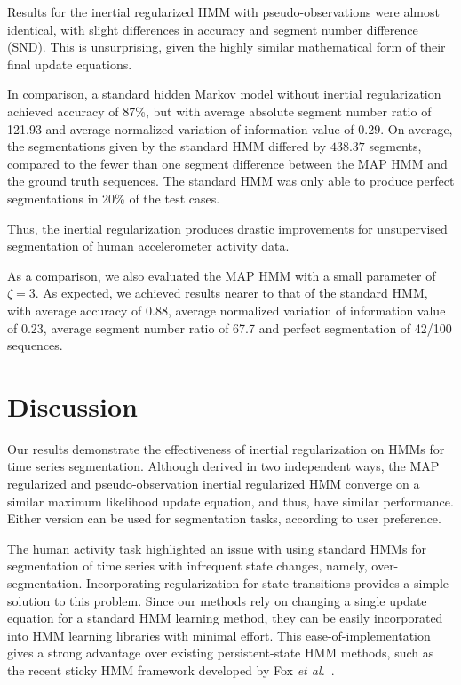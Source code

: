 \documentclass[12pt]{article}
\begin{document}
Results for the inertial regularized HMM with pseudo-observations were almost identical, with slight differences in accuracy and segment number difference (SND). This is unsurprising, given the highly similar mathematical form of their final update equations.

In comparison, a standard hidden Markov model without inertial regularization achieved accuracy of 87\%, but with average absolute segment number ratio of 121.93 and average normalized variation of information value of $0.29$. On average, the segmentations given by the standard HMM differed by $438.37$ segments, compared to the fewer than one segment difference between the MAP HMM and the ground truth sequences. The standard HMM was only able to produce perfect segmentations in 20\% of the test cases.

Thus, the inertial regularization produces drastic improvements for unsupervised segmentation of human accelerometer activity data.

As a comparison, we also evaluated the MAP HMM with a small parameter of $\zeta = 3$. As expected, we achieved results nearer to that of the standard HMM, with average accuracy of 0.88, average normalized variation of information value of 0.23, average segment number ratio of 67.7 and perfect segmentation of 42/100 sequences.

\section{Discussion}

Our results demonstrate the effectiveness of inertial regularization on HMMs for time series segmentation. Although derived in two independent ways, the MAP regularized and pseudo-observation inertial regularized HMM converge on a similar maximum likelihood update equation, and thus, have similar performance. Either version can be used for segmentation tasks, according to user preference. 

The human activity task highlighted an issue with using standard HMMs for segmentation of time series with infrequent state changes, namely, over-segmentation. Incorporating regularization for state transitions provides a simple solution to this problem. Since our methods rely on changing a single update equation for a standard HMM learning method, they can be easily incorporated into HMM learning libraries with minimal effort. This ease-of-implementation gives a strong advantage over existing persistent-state HMM methods, such as the recent sticky HMM framework developed by Fox \emph{et al.}~\cite{fox2011sticky}.
\end{document}
